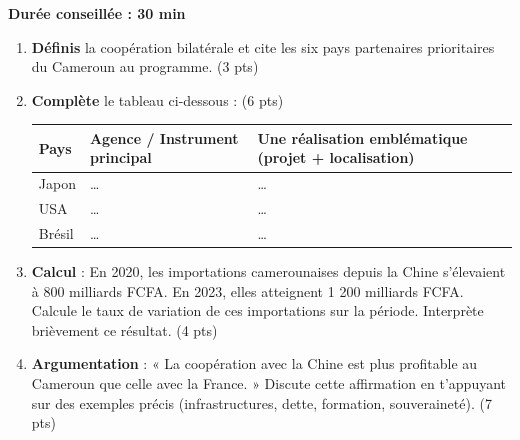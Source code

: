 \documentclass[11pt]{article}
\begin{document}
\begin{exercice}
\textbf{Durée conseillée : 30 min}
\begin{enumerate}
\item \textbf{Définis} la coopération bilatérale et cite les six pays partenaires prioritaires du Cameroun au programme. (3 pts)
\item \textbf{Complète} le tableau ci-dessous : (6 pts)
\begin{center}
\begin{tabularx}{\linewidth}{|l|X|X|}
\hline
\rowcolor{popblueL} \textbf{Pays} & \textbf{Agence / Instrument principal} & \textbf{Une réalisation emblématique (projet + localisation)} \\
\hline
Japon & \ldots & \ldots \\
\hline
USA & \ldots & \ldots \\
\hline
Brésil & \ldots & \ldots \\
\hline
\end{tabularx}
\end{center}
\item \textbf{Calcul} : En 2020, les importations camerounaises depuis la Chine s'élevaient à 800 milliards FCFA. En 2023, elles atteignent 1 200 milliards FCFA. Calcule le taux de variation de ces importations sur la période. Interprète brièvement ce résultat. (4 pts)
\item \textbf{Argumentation} : « La coopération avec la Chine est plus profitable au Cameroun que celle avec la France. » Discute cette affirmation en t'appuyant sur des exemples précis (infrastructures, dette, formation, souveraineté). (7 pts)
\end{enumerate}
\end{exercice}
\end{document}
